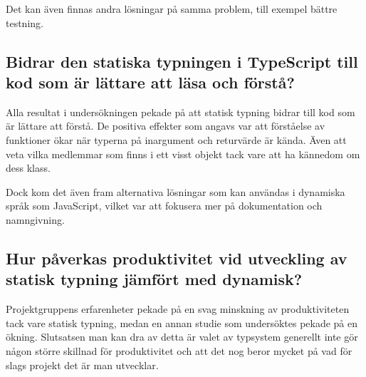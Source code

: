 Det kan även finnas andra lösningar på samma problem, till exempel bättre testning.
\subsection{Bidrar den statiska typningen i TypeScript till kod som är lättare att läsa och förstå?}
Alla resultat i undersökningen pekade på att statisk typning bidrar till kod som är lättare att förstå. De positiva effekter som angavs var att förståelse av funktioner ökar när typerna på inargument och returvärde är kända. Även att veta vilka medlemmar som finns i ett visst objekt tack vare att ha kännedom om dess klass.

Dock kom det även fram alternativa lösningar som kan användas i dynamiska språk som JavaScript, vilket var att fokusera mer på dokumentation och namngivning.
\subsection{Hur påverkas produktivitet vid utveckling av statisk typning jämfört med dynamisk?}
Projektgruppens erfarenheter pekade på en svag minskning av produktiviteten tack vare statisk typning, medan en annan studie som undersöktes pekade på en ökning. Slutsatsen man kan dra av detta är valet av typsystem generellt inte gör någon större skillnad för produktivitet och att det nog beror mycket på vad för slags projekt det är man utvecklar.

